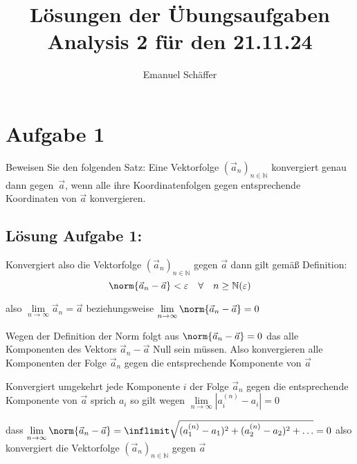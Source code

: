 \documentclass[ngerman, a4paper]{scrartcl}
\begin{document}
	\title{Lösungen der Übungsaufgaben Analysis 2 für den 21.11.24}
	\author{Emanuel Schäffer}
	\maketitle
	
	\section*{Aufgabe 1}
	Beweisen Sie den folgenden Satz: Eine Vektorfolge $(\vec{a}_n)_{n\in \mathbb{N}}$ konvergiert genau dann gegen~$\vec{a}$, wenn alle ihre Koordinatenfolgen gegen entsprechende Koordinaten von $\vec{a}$ konvergieren.
	
	\vspace{0.5cm}
	\subsection*{Lösung Aufgabe 1:}
	
	\noindent Konvergiert also die Vektorfolge $(\vec{a}_n)_{n\in \mathbb{N}}$ gegen $\vec{a}$
	dann gilt gemäß Definition:
	\[\norm{\vec{a}_n - \vec{a}} < \varepsilon \quad \forall \quad n \ge \mathbb{N}(\varepsilon)\]
	
	also $\lim\limits_{n\rightarrow\infty} \vec{a}_n = \vec{a}$ beziehungsweise $\lim\limits_{n\rightarrow\infty} \norm{\vec{a}_n - \vec{a}} = 0$ 
	
	\noindent Wegen der Definition der Norm folgt aus $\norm{\vec{a}_n - \vec{a}} = 0$ das alle Komponenten des Vektors $\vec{a}_n - \vec{a}$ Null sein müssen. Also konvergieren alle Komponenten der Folge $\vec{a}_n$ gegen die entsprechende Komponente von $\vec{a}$
	
	\vspace{0.5cm}
	
	Konvergiert umgekehrt jede Komponente $i$ der Folge $\vec{a}_n$ gegen die entsprechende Komponente von  $\vec{a}$ sprich $a_i$ so gilt wegen $\lim\limits_{n\rightarrow\infty}|a_i^{(n)} - a_i| = 0$ 
	
	\noindent dass 
	$\lim\limits_{n\rightarrow\infty}\norm{\vec{a}_n - \vec{a}} = 
	\inflimit \sqrt{(a_1^ {(n)} - a_1)^2 + (a_2^ {(n)} - a_2)^2 + \ldots} = 0$ also konvergiert die Vektorfolge $(\vec{a}_n)_{n\in\mathbb{N}}$ gegen $\vec{a}$

	
\end{document}
